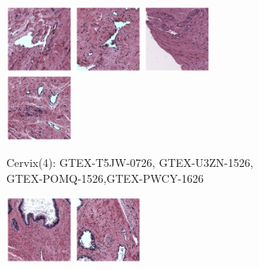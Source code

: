 \documentclass{l4proj}
\begin{document}
\begin{figure}[h]
    \centering
    \begin{subfigure}[b]{\textwidth}
        \includegraphics[width=0.24\textwidth]{images/cervix4_1.png}
        \includegraphics[width=0.24\textwidth]{images/cervix4_2.png}
        \includegraphics[width=0.24\textwidth]{images/cervix4_3.png}
        \includegraphics[width=0.24\textwidth]{images/cervix4_4.png}
        \caption{Cervix(4): GTEX-T5JW-0726, GTEX-U3ZN-1526, GTEX-POMQ-1526,GTEX-PWCY-1626}
        \label{fig:cervix4}
    \end{subfigure}
    \begin{subfigure}[b]{\textwidth}
        \includegraphics[width=0.24\textwidth]{images/prostate4_1.png}
        \includegraphics[width=0.24\textwidth]{images/prostate4_2.png}

\end{subfigure}
\end{figure}
\end{document}
